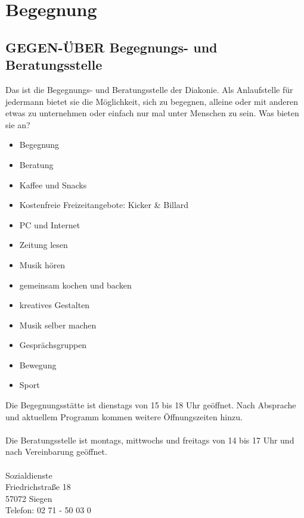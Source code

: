 \chapter{Begegnung}

\section{GEGEN-ÜBER Begegnungs- und Beratungsstelle}
Das ist die Begegnungs- und Beratungsstelle der Diakonie. Als Anlaufstelle für jedermann bietet sie die Möglichkeit, sich zu begegnen, alleine oder mit anderen etwas zu unternehmen oder einfach nur mal unter Menschen zu sein. Was bieten sie an?

\begin{itemize}
	\item Begegnung
	\item Beratung
	\item Kaffee und Snacks
	\item Kostenfreie Freizeitangebote: Kicker \& Billard
	\item PC und Internet
	\item Zeitung lesen
	\item Musik hören
	\item gemeinsam kochen und backen
	\item kreatives Gestalten
	\item Musik selber machen
	\item Gesprächsgruppen
	\item Bewegung
	\item Sport
\end{itemize}

Die Begegnungsstätte ist dienstags von 15 bis 18 Uhr geöffnet. Nach Absprache und aktuellem Programm kommen weitere Öffnungszeiten hinzu.\\
\\
Die Beratungsstelle ist montags, mittwochs und freitags von 14 bis 17 Uhr und nach Vereinbarung geöffnet.\\
\\
Sozialdienste \\
Friedrichstraße 18\\
57072 Siegen\\
Telefon: 02 71 - 50 03 0 \\

